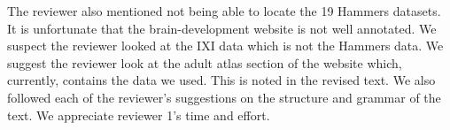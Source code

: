 \documentclass[11pt]{article}
\begin{document}
\newline
\newline
The reviewer also mentioned not being able to locate the 19 Hammers
datasets.  It is unfortunate that the brain-development website is not
well annotated.  We suspect the reviewer looked at the IXI data which
is not the Hammers data.  We suggest the reviewer look at the adult
atlas section of the website which, currently, contains the data we
used.  This is noted in the revised text. 
\newline
\newline
We also followed each of the reviewer's suggestions on the structure
and grammar of the text. 
\newline
\newline
We appreciate reviewer 1's time and effort.  
\newline
\newline
\end{document}
